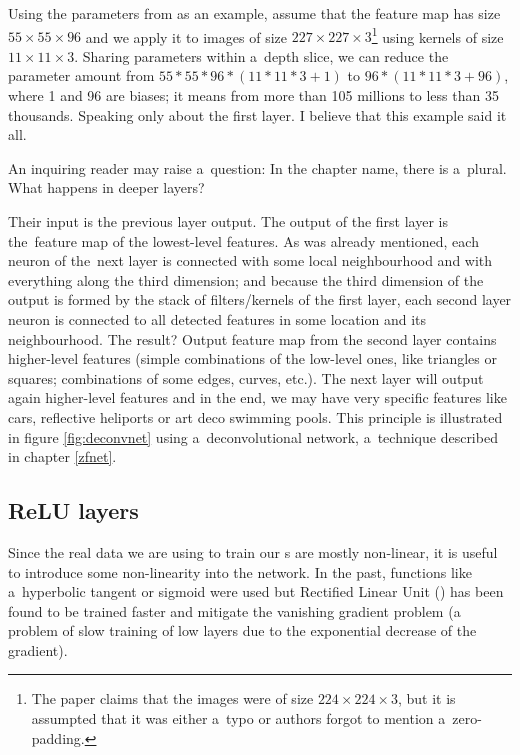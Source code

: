 Using the parameters from \cite{cnn-classification} as an example, assume that
the feature map has size $55 \times 55 \times 96$ and we apply it to images of
size $227 \times 227 \times 3$\footnote{The paper claims that the images were
of size $224 \times 224 \times 3$, but it is assumpted that it was either
a~typo or authors forgot to mention a~zero-padding.} using kernels of size
$11 \times 11 \times 3$. Sharing parameters within a~depth slice, we can reduce
the parameter amount from $55 * 55 * 96 * (11 * 11 * 3 + 1)$ to
$96 * (11 * 11 * 3 + 96)$, where 1 and 96 are biases; it means from more than
105 millions to less than 35 thousands. Speaking only about the first layer. I
believe that this example said it all. 

An inquiring reader may raise a~question: In the chapter name, there is
a~plural. What happens in deeper layers? 

Their input is the previous layer output. The output of the first layer is
the~feature map of the lowest-level features. As was already mentioned, each
neuron of the~next layer is connected with some local neighbourhood and with
everything along the third dimension; and because the third dimension of the
output is formed by the stack of filters/kernels of the first layer, each
second layer neuron is connected to all detected features in some location and
its neighbourhood. The result? Output feature map from the second layer
contains higher-level features (simple combinations of the low-level ones, like
triangles or squares; combinations of some edges, curves, etc.). The next layer
will output again higher-level features and in the end, we may have very 
specific features like cars, reflective heliports or art deco swimming pools. 
This principle is illustrated in figure \ref{fig:deconvnet} using
a~deconvolutional network, a~technique described in chapter \ref{zfnet}.

\subsection{ReLU layers}
\label{relu-layers}

Since the real data we are using to train our s are mostly non-linear, 
it is useful to introduce some non-linearity into the network. In the past, 
functions like a~hyperbolic tangent or sigmoid were used but Rectified Linear 
Unit () has been found to be trained faster and mitigate the vanishing
gradient problem (a problem of slow training of low layers due to the
exponential decrease of the gradient). 

